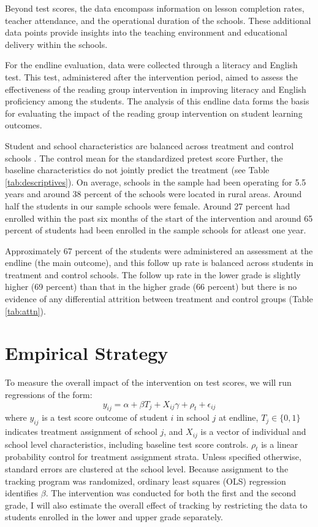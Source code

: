 \documentclass[12pt]{article}
\begin{document}
Beyond test scores, the data encompass information on lesson completion rates, teacher attendance, and the operational duration of the schools. These additional data points provide insights into the teaching environment and educational delivery within the schools.

For the endline evaluation, data were collected through a literacy and English test. This test, administered after the intervention period, aimed to assess the effectiveness of the reading group intervention in improving literacy and English proficiency among the students. The analysis of this endline data forms the basis for evaluating the impact of the reading group intervention on student learning outcomes.

Student and school characteristics are balanced across treatment and control schools . The control mean for the standardized pretest score Further, the baseline characteristics do not jointly predict the treatment (see Table \ref{tab:descriptives}). On average, schools in the sample had been operating for 5.5 years and around 38 percent of the schools were located in rural areas. Around half the students in our sample schools were female. Around 27 percent had enrolled within the past six months of the start of the intervention and around 65 percent of students had been enrolled in the sample schools for atleast one year.

Approximately  67 percent of the students were administered an assessment at
the endline (the main outcome), and this follow up rate is balanced across students in treatment
and control schools. The follow up rate in the lower grade is slightly higher (69 percent) than that in the higher grade (66 percent) but there is no evidence of any differential attrition between treatment and control groups (Table \ref{tab:attn}). 

\section{Empirical Strategy}
\label{sec:empirical}

To measure the overall impact of the intervention on test scores, we will run regressions of the form:
\[ y_{ij} = \alpha + \beta T_j + X_{ij} \gamma + \rho_t +\epsilon_{ij}  \]
where $y_{ij}$ is a test score outcome of student $i$ in school $j$ at endline, $T_j \in \{0,1\}$ indicates  treatment assignment of school $j$, and $X_{ij}$ is a vector of individual and school level characteristics, including baseline test score controls. $\rho_t$ is a linear probability control for treatment assignment strata. Unless specified otherwise, standard errors are clustered at the school level. Because assignment to the tracking program was randomized, ordinary least squares (OLS) regression identifies $\beta$. The intervention was conducted for both the first and the second grade, I will also estimate the overall effect of tracking by restricting the data to students enrolled in the lower and upper grade separately.
\end{document}
